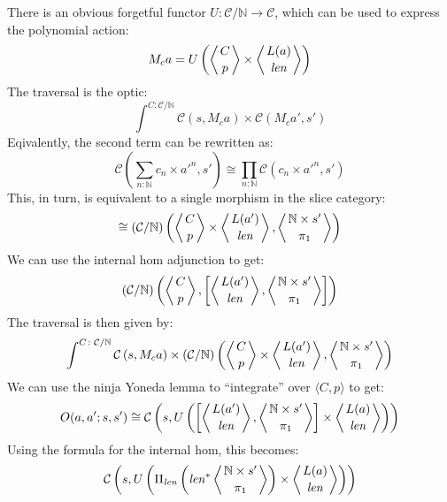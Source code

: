 \documentclass[11pt]{amsart}
\begin{document}
There is an obvious forgetful functor $U \colon \mathcal{C}/\mathbb{N} \to \mathcal{C}$, which can be used to express the polynomial action:
\[ M_c a = U\left( 
  \left \langle {C \atop p} \right \rangle \times \left \langle {L(a) \atop \mathit{len}} \right \rangle \right) \]
The traversal is the optic:
\[ \int^{C \colon \mathcal{C}/\mathbb{N}} \mathcal{C} 
\left(s, M_c a \right)  
  \times \mathcal{C}(M_c a', s') \]
Eqivalently, the second term can be rewritten as:
\[  \mathcal{C}( \sum_{n \colon \mathbb{N}} c_n \times a'^n, s') \cong \prod_{n \colon  \mathbb{N}}  \mathcal{C}(c_n \times a'^n, s')\]
This, in turn, is equivalent to a single morphism in the slice category:
\[ 
 \cong  
(\mathcal{C}/\mathbb{N})\left(\left \langle {C \atop p} \right \rangle \times \left \langle {L(a') \atop \mathit{len}} \right \rangle, \left \langle {\mathbb{N} \times s' \atop \pi_1} \right \rangle \right) \]
We can use the internal hom adjunction to get:
\[ 
(\mathcal{C}/\mathbb{N})\left(\left \langle {C \atop p} \right \rangle, \left[ \left \langle {L(a') \atop \mathit{len}} \right \rangle, \left \langle {\mathbb{N} \times s' \atop \pi_1} \right \rangle \right] \right) \]
The traversal is then given by:
\[ \int^{C \colon \mathcal{C}/\mathbb{N}} \mathcal{C} 
\left(s,  M_c a \right)  
  \times (\mathcal{C}/\mathbb{N})\left( \left \langle {C \atop p} \right \rangle 
  \times \left \langle {L(a') \atop \mathit{len}} \right \rangle, \left \langle {\mathbb{N} \times s' \atop \pi_1} \right \rangle \right) \]
We can use the ninja Yoneda lemma to ``integrate'' over $\langle C, p \rangle$ to get:
\[ O(a, a'; s, s') \cong \mathcal{C} \left(  s, U\left( 
  \left[ \left \langle {L(a') \atop \mathit{len}} \right \rangle, \left \langle {\mathbb{N} \times s' \atop \pi_1} \right \rangle \right] \times \left \langle {L(a) \atop \mathit{len}} \right \rangle \right) \right) \]
Using the formula for the internal hom, this becomes:
\[ \mathcal{C} \left(  s, U\left( \Pi_{\mathit{len}} \left( \mathit{len}^*
   \left \langle {\mathbb{N} \times s' \atop \pi_1} \right \rangle \right) \times \left \langle {L(a) \atop \mathit{len}} \right \rangle \right) \right) \]
\end{document}
